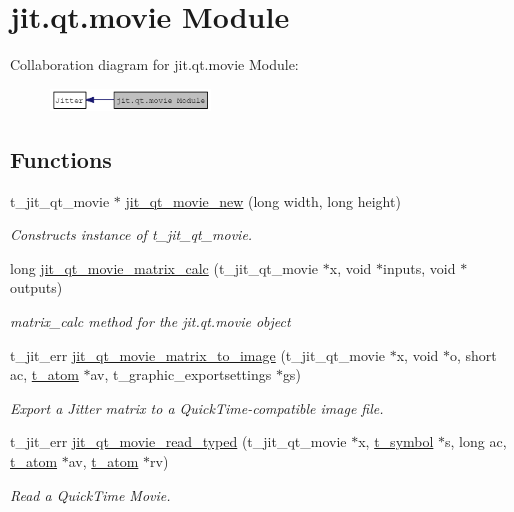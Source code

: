 \hypertarget{group__qtmoviemod}{
\section{jit.qt.movie Module}
\label{group__qtmoviemod}
}


Collaboration diagram for jit.qt.movie Module:\nopagebreak
\begin{figure}[H]
\begin{center}
\leavevmode
\includegraphics[width=121pt]{group__qtmoviemod}
\end{center}
\end{figure}
\subsection*{Functions}
\begin{DoxyCompactItemize}
\item 
t\_\-jit\_\-qt\_\-movie $\ast$ \hyperlink{group__qtmoviemod_gaa771bc8d5b2f69cd74b5d2d69e777063}{jit\_\-qt\_\-movie\_\-new} (long width, long height)
\begin{DoxyCompactList}\small\item\em Constructs instance of t\_\-jit\_\-qt\_\-movie. \item\end{DoxyCompactList}\item 
long \hyperlink{group__qtmoviemod_ga422c5a6770e1cc1886785a494348d84a}{jit\_\-qt\_\-movie\_\-matrix\_\-calc} (t\_\-jit\_\-qt\_\-movie $\ast$x, void $\ast$inputs, void $\ast$outputs)
\begin{DoxyCompactList}\small\item\em matrix\_\-calc method for the jit.qt.movie object \item\end{DoxyCompactList}\item 
t\_\-jit\_\-err \hyperlink{group__qtmoviemod_ga8ce71c8eacec87a89ce1bc964de16a7a}{jit\_\-qt\_\-movie\_\-matrix\_\-to\_\-image} (t\_\-jit\_\-qt\_\-movie $\ast$x, void $\ast$o, short ac, \hyperlink{structt__atom}{t\_\-atom} $\ast$av, t\_\-graphic\_\-exportsettings $\ast$gs)
\begin{DoxyCompactList}\small\item\em Export a Jitter matrix to a QuickTime-\/compatible image file. \item\end{DoxyCompactList}\item 
t\_\-jit\_\-err \hyperlink{group__qtmoviemod_ga2218192fcdfb3f999a7097b719d75c78}{jit\_\-qt\_\-movie\_\-read\_\-typed} (t\_\-jit\_\-qt\_\-movie $\ast$x, \hyperlink{structt__symbol}{t\_\-symbol} $\ast$s, long ac, \hyperlink{structt__atom}{t\_\-atom} $\ast$av, \hyperlink{structt__atom}{t\_\-atom} $\ast$rv)
\begin{DoxyCompactList}\small\item\em Read a QuickTime Movie. \item\end{DoxyCompactList}\end{DoxyCompactItemize}


